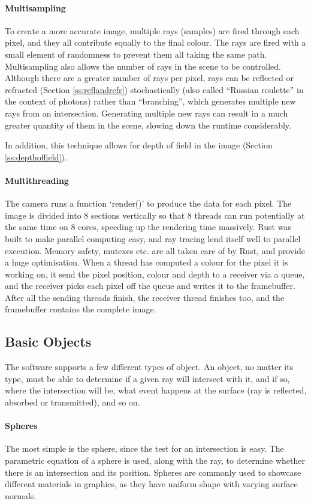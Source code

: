 \documentclass[a4paper]{article}
\begin{document}
\paragraph{Multisampling} To create a more accurate image, multiple rays (samples) are fired through each pixel, and they all contribute equally to the final colour. The rays are fired with a small element of randomness to prevent them all taking the same path. Multisampling also allows the number of rays in the scene to be controlled. Although there are a greater number of rays per pixel, rays can be reflected or refracted (Section \ref{ss:reflandrefr}) stochastically (also called ``Russian roulette'' in the context of photons) rather than ``branching'', which generates multiple new rays from an intersection. Generating multiple new rays can result in a much greater quantity of them in the scene, slowing down the runtime considerably.

In addition, this technique allows for depth of field in the image (Section \ref{ss:depthoffield}).

\paragraph{Multithreading}
The camera runs a function `render()' to produce the data for each pixel. The image is divided into 8 sections vertically so that 8 threads can run potentially at the same time on 8 cores, speeding up the rendering time massively. Rust was built to make parallel computing easy, and ray tracing lend itself well to parallel execution. Memory safety, mutexes etc. are all taken care of by Rust, and provide a huge optimisation. When a thread has computed a colour for the pixel it is working on, it send the pixel position, colour and depth to a receiver via a queue, and the receiver picks each pixel off the queue and writes it to the framebuffer. After all the sending threads finish, the receiver thread finishes too, and the framebuffer contains the complete image.

\subsection{Basic Objects}
The software supports a few different types of object. An object, no matter its type, must be able to determine if a given ray will intersect with it, and if so, where the intersection will be, what event happens at the surface (ray is reflected, absorbed or transmitted), and so on.

\paragraph{Spheres} The most simple is the sphere, since the test for an intersection is easy. The parametric equation of a sphere is used, along with the ray, to determine whether there is an intersection and its position. Spheres are commonly used to showcase different materials in graphics, as they have uniform shape with varying surface normals.
\end{document}
